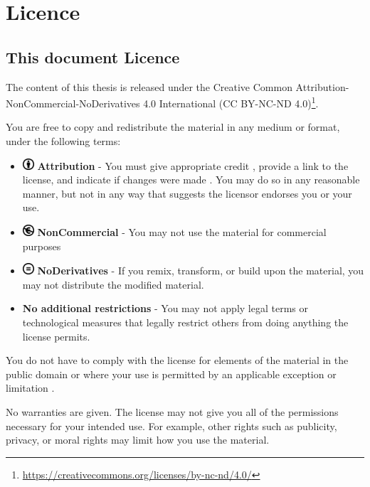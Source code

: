 \section{Licence}
\label{sec:licence}

\subsection{This document Licence}
The content of this thesis is released under the Creative Common Attribution-NonCommercial-NoDerivatives 4.0 International ({CC BY-NC-ND 4.0})\footnote{\url{https://creativecommons.org/licenses/by-nc-nd/4.0/}}. 

You are free to copy and redistribute the material in any medium or format, under the following terms:
\begin{itemize}
    \item \includegraphics[width=12pt]{images/CreativeCommons/by.eps}\textbf{ Attribution} - You must give appropriate credit , provide a link to the license, and indicate if changes were made . You may do so in any reasonable manner, but not in any way that suggests the licensor endorses you or your use.
    \item \includegraphics[width=12pt]{images/CreativeCommons/nc-eu.eps}\textbf{ NonCommercial} - You may not use the material for commercial purposes 
    \item \includegraphics[width=12pt]{images/CreativeCommons/nd.eps}\textbf{ NoDerivatives} - If you remix, transform, or build upon the material, you may not distribute the modified material.
    \item \textbf{No additional restrictions} - You may not apply legal terms or technological measures that legally restrict others from doing anything the license permits.
\end{itemize}

You do not have to comply with the license for elements of the material in the public domain or where your use is permitted by an applicable exception or limitation .

No warranties are given. The license may not give you all of the permissions necessary for your intended use. For example, other rights such as publicity, privacy, or moral rights may limit how you use the material.

